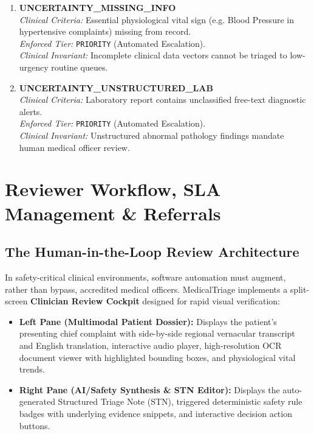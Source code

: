 \documentclass[11pt,a4paper,oneside]{report}
\begin{document}
\begin{enumerate}[leftmargin=20pt, resume]
  \item \textbf{UNCERTAINTY\_MISSING\_INFO}\\
  \textit{Clinical Criteria:} Essential physiological vital sign (e.g. Blood Pressure in hypertensive complaints) missing from record.\\
  \textit{Enforced Tier:} \texttt{PRIORITY} (Automated Escalation).\\
  \textit{Clinical Invariant:} Incomplete clinical data vectors cannot be triaged to low-urgency routine queues.

  \item \textbf{UNCERTAINTY\_UNSTRUCTURED\_LAB}\\
  \textit{Clinical Criteria:} Laboratory report contains unclassified free-text diagnostic alerts.\\
  \textit{Enforced Tier:} \texttt{PRIORITY} (Automated Escalation).\\
  \textit{Clinical Invariant:} Unstructured abnormal pathology findings mandate human medical officer review.
\end{enumerate}

\chapter{Reviewer Workflow, SLA Management \& Referrals}

\section{The Human-in-the-Loop Review Architecture}
In safety-critical clinical environments, software automation must augment, rather than bypass, accredited medical officers. MedicalTriage implements a split-screen \textbf{Clinician Review Cockpit} designed for rapid visual verification:
\begin{itemize}[leftmargin=20pt]
  \item \textbf{Left Pane (Multimodal Patient Dossier):} Displays the patient's presenting chief complaint with side-by-side regional vernacular transcript and English translation, interactive audio player, high-resolution OCR document viewer with highlighted bounding boxes, and physiological vital trends.
  \item \textbf{Right Pane (AI/Safety Synthesis \& STN Editor):} Displays the auto-generated Structured Triage Note (STN), triggered deterministic safety rule badges with underlying evidence snippets, and interactive decision action buttons.
\end{itemize}
\end{document}

